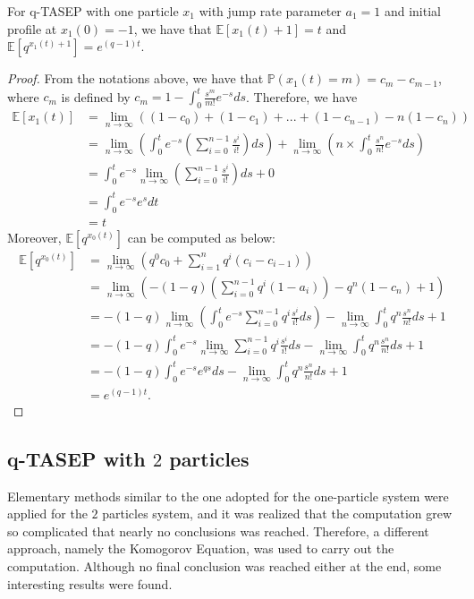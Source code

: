 \begin{proposition}
For q-TASEP with one particle $x_1$ with jump rate parameter $a_1 = 1$ and initial profile at $x_1(0) = -1$, we have that $\mathbb{E}[x_1(t)+1] = t$ and $\mathbb{E}[q^{x_1(t)+1}] = e^{(q-1)t}$.
\end{proposition}

\begin{proof}
From the notations above, we have that $\mathbb{P}(x_1(t) = m) = c_m - c_{m-1}$, where $c_m$ is defined by $c_m = 1 - \int_0^t \frac{s^m}{m!} e^{-s} ds$. Therefore, we have
\begin{align*}
\mathbb{E}[x_1(t)] &=  \lim_{n \to \infty} ((1-c_0) + (1-c_1) + ... + (1-c_{n-1}) - n ( 1-c_n))\\
  						&= \lim_{n \to \infty} (\int_{0}^{t} e^{-s}  (\sum_{i=0}^{n-1} \frac{s^i}{i!}) ds) +\lim_{n \to \infty} (n \times \int_{0}^{t} \frac{s^n}{n!} e^{-s} ds)\\
						&=  \int_{0}^{t} e^{-s} \lim_{n \to \infty} (\sum_{i=0}^{n-1} \frac{s^i}{i!}) ds + 0\\
						&=  \int_{0}^{t} e^{-s} e^s dt\\
						&= t
\end{align*}
Moreover, $\mathbb{E}[q^{x_0(t)}]$ can be computed as below: 
\begin{align*}
\mathbb{E}[q^{x_0(t)}] &= \lim_{n \to \infty} (q^0  c_0 + \sum_{i=1}^{n} q^i (c_i - c_{i-1}) )\\
											 &= \lim_{n \to \infty} (-(1-q) (\sum_{i=0}^{n-1} q^i (1-a_i)) - q^n (1-c_n) + 1)\\
											 &= - (1-q) \lim_{n \to \infty} ( \int_{0}^{t} e^{-s} \sum_{i=0}^{n-1} q^i \frac{s^i}{i!} ds) - \lim_{n \to \infty} \int_0^t q^n \frac{s^n}{n!} ds + 1\\
											 &=  - (1-q) \int_0^t e^{-s }  \lim_{n \to \infty} \sum_{i=0}^{n-1} q^i \frac{s^i}{i!} ds- \lim_{n \to \infty} \int_0^t q^n \frac{s^n}{n!} ds + 1\\
				     					 &=  - (1-q) \int_0^t e^{-s } e^{qs}  ds -\lim_{n \to \infty}  \int_0^t q^n \frac{s^n}{n!} ds + 1\\
				     					 &= e^{(q-1)t}.
\end{align*}
\end{proof}

\subsection{q-TASEP with $2$ particles}
Elementary methods similar to the one adopted for the one-particle system were applied for the $2$ particles system, and it was realized that the computation grew so complicated that nearly no conclusions was reached. Therefore, a different approach, namely the Komogorov Equation, was used to carry out the computation. Although no final conclusion was reached either at the end, some interesting results were found. 

